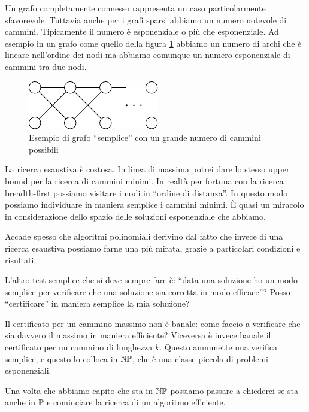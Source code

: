 Un grafo completamente connesso rappresenta un caso particolarmente sfavorevole. Tuttavia anche per
i grafi sparsi abbiamo un numero notevole di cammini. Tipicamente il numero è esponenziale o più
che esponenziale. Ad esempio in un grafo come quello della figura \ref{PathsNumber} abbiamo un
numero di archi che è lineare nell'ordine dei nodi ma abbiamo comunque un numero esponenziale di
cammini tra due nodi.

\begin{figure}[h]
    \begin{center}
        \includegraphics{img/ExponentialPathsNumber.pdf}
    \end{center}
    \caption{Esempio di grafo ``semplice'' con un grande numero di cammini possibili}
    \label{PathsNumber}
\end{figure}

La ricerca esaustiva è costosa. In linea di massima potrei dare lo stesso upper bound per la
ricerca di cammini minimi. In realtà per fortuna con la ricerca breadth-first possiamo visitare i
nodi in ``ordine di distanza''. In questo modo possiamo individuare in maniera semplice i cammini
minimi. È quasi un miracolo in considerazione dello spazio delle soluzioni esponenziale che
abbiamo. 

Accade spesso che algoritmi polinomiali derivino dal fatto che invece di una ricerca esaustiva
possiamo farne una più mirata, grazie a particolari condizioni e risultati.

L'altro test semplice che si deve sempre fare è: ``data una soluzione ho un modo semplice per
verificare che una soluzione sia corretta in modo efficace''? Posso ``certificare'' in maniera
semplice la mia soluzione?

Il certificato per un cammino massimo non è banale: come faccio a verificare che sia davvero il
massimo in maniera efficiente? Viceversa è invece banale il certificato per un cammino di lunghezza
$k$. Questo ammmette una verifica semplice, e questo lo colloca in $\mathbb{NP}$, che è una classe
piccola di problemi esponenziali.

Una volta che abbiamo capito che sta in $\mathbb{NP}$ possiamo passare a chiederci se sta anche in
$\mathbb{P}$ e cominciare la ricerca di un algoritmo efficiente.

